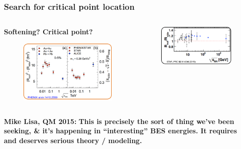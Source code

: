 \documentclass[dvipsnames] {beamer}
\begin{document}
\begin{frame}
  \frametitle{Search for critical point location}
  \begin{columns}
    \begin{block}{\bf \centering Softening? Critical point?}
      \begin{figure}[H]
        \includegraphics[width=.8\linewidth]{Rout2Rside2.png}
      \end{figure}
    \end{block}
    \begin{block}{}
       \begin{figure}[H]
        \includegraphics[width=.9\linewidth]{RoutRside_scale.png}
      \end{figure}
    \end{block}
  \end{columns}
  
  \begin{block}{ \bf \centering Mike Lisa, QM 2015:}
    \bf
    {\color{red} This is precisely the sort of thing we’ve been seeking, \& it’s happening in ``interesting'' BES energies.
    It requires and deserves serious theory / modeling.}
  \end{block}
\end{frame}
\end{document}
